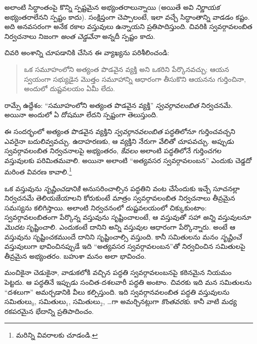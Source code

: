 \documentclass[../../../include/open-logic-section]{subfiles}
\begin{document}
అలాంటి సిద్ధాంతంపై కొన్ని
స్పష్టమైన అభ్యంతరాలున్నాయి
(అయితే అవి \emph{నిర్ణాయక}
అభ్యంతరాలేనని స్పష్టం కాదు).
సంక్షిప్తంగా చెప్పాలంటే, ఇలా వచ్చే సిద్ధాంతాన్ని వాడడం కష్టం. అది అనవసరంగా అనేక
రకాల వస్తువులు ఉన్నాయని ప్రతిపాదిస్తుంది. చివరికి
స్వవర్గావలంబిత నిర్వచనాలు
నిజంగా \emph{అంత చెడ్డవేనా}
అన్నదీ స్పష్టం కాదు.
	
చివరి అంశాన్ని చూపడానికి
\citeauthor{Ramsey1925} చేసిన
ఈ వ్యాఖ్యను పరిశీలించండి:
\begin{quote}
	ఒక సమూహంలోని అత్యంత
	పొడవైన వ్యక్తి అని
	ఒకరిని పేర్కొనవచ్చు;
	ఆయన స్వయంగా సభ్యుడైన
	మొత్తం సమూహాన్ని
	ఆధారంగా తీసుకొని
	ఆయనను గుర్తించినా,
	అందులో దుష్టవలయం
	ఏమీ లేదు. \citep{Ramsey1925}
\end{quote}
రామ్సే ఉద్దేశం: ``సమూహంలోని
అత్యంత పొడవైన వ్యక్తి''
\emph{స్వవర్గావలంబిత}
నిర్వచనమే. అయినా అందులో ఏ దోషమూ లేదని
స్పష్టంగా తెలుస్తుంది.

ఈ సందర్భంలో అత్యంత
పొడవైన వ్యక్తిని
\emph{స్వవర్గానవలంబిత}
పద్ధతిలోనూ గుర్తించవచ్చని
ఎవరైనా బదులివ్వవచ్చు.
ఉదాహరణకు, ఆ వ్యక్తిని
నేరుగా వేలితో చూపవచ్చు.
అప్పుడు స్వవర్గావలంబిత
నిర్వచనాలపై అభ్యంతరం,
\emph{కేవలం} అలాంటి
పద్ధతిలోనే గుర్తించగల
వస్తువులకు పరిమితమవాలి.
అయినా అలాంటి ``అత్యవసర
స్వవర్గావలంబన'' ఎందుకు
చెడ్డదో మరింత వివరణ
కావాలి.\footnote{మరిన్ని
వివరాలకు \citet{Linnebo2010}
చూడండి.}

ఒక వస్తువును \emph{సృష్టించడానికి} అనుసరించాల్సిన
పద్ధతిని వంట చేసేందుకు ఇచ్చే సూచనల్లా నిర్వచనమే తెలియజేయాలని కోరుకుంటే మాత్రం
స్వవర్గావలంబిత నిర్వచనాలు తీవ్రమైన సమస్యను కలిగిస్తాయి.
అలాంటి నిర్వచనంలో
దుష్టవలయంలో చిక్కుకుంటాం:
స్వవర్గావలంబితంగా పేర్కొన్న
వస్తువును సృష్టించాలంటే,
ఆ వస్తువుతో సహా \emph{అన్ని}
వస్తువులనూ \emph{మొదట}
సృష్టించాలి. ఎందుకంటే
దానిని అన్ని వస్తువుల
ఆధారంగా పేర్కొన్నారు.
అంటే ఆ వస్తువును
సృష్టించకముందే దానిని
సృష్టించాల్సి వస్తుంది.
కానీ సమితులను మనం
\emph{సృష్టించే} వస్తువులుగా
భావించినప్పుడే ఇది
``అత్యవసర స్వవర్గావలంబన''తో
నిర్వచించిన సమితులపై
తీవ్రమైన అభ్యంతరం.
బహుశా మనం అలా భావించం.

మంచికైనా చెడుకైనా,
వాడుకలోకి వచ్చిన పద్ధతి స్వవర్గావలంబనపై కఠినమైన
నియమం పెట్టదు. ఆ పద్ధతినే ఇప్పుడు సంచిత-దశలవారీ పద్ధతి అంటాం.
చివరకు ఇది మన సమితులను
``దశలుగా'' అమర్చడానికి
వీలు కల్పిస్తుంది. ఇది
స్వవర్గానవలంబిత పద్ధతి
వస్తువులను సమితులు$_0$,
సమితులు$_1$, సమితులు$_2$,
\ldots గా అమర్చినట్లుగా
\emph{కొంతవరకు}. కానీ
వాటి మధ్య రకపరమైన
భేదాన్ని ప్రతిపాదించం.
\end{document}

